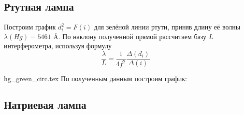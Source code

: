 \subsection{Ртутная лампа}
Построим график $d_i^2 = F(i)$ для зелёной линии ртути, приняв 
длину её волны $\lambda (Hg) = 5461$ \AA. По наклону 
полученной прямой рассчитаем базу $L$ интерферометра, используя 
формулу 
\begin{equation}\label{eq::A_2}
  \frac{\lambda}{L} = \frac{1}{4f^2} \frac{\Delta(d_i)}{\Delta(i)}
\end{equation}


{hg_green_circ.tex}
По полученным данным построим график:

\begin{figure}[h]
\end{figure}

\subsection{Натриевая лампа}